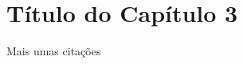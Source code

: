 \chapter{Título do Capítulo 3}
\label{cap3}

\lipsum

Mais umas citações \cite{AndroidTools, Chen1976}
